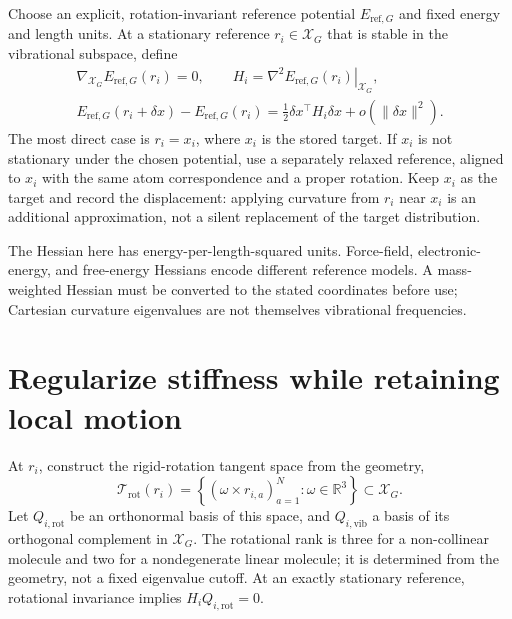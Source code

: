 \documentclass[11pt,letterpaper]{article}
\newcommand{\R}{\mathbb R}
\newcommand{\X}{\mathcal X_G}
\newcommand{\rot}{\mathrm{rot}}
\newcommand{\vib}{\mathrm{vib}}
\begin{document}
Choose an explicit, rotation-invariant reference potential $E_{\mathrm{ref},G}$ and fixed energy and length units. At a stationary reference $r_i\in\X$ that is stable in the vibrational subspace, define
\begin{equation}\label{eq:hessian}
\begin{gathered}
\nabla_{\X} E_{\mathrm{ref},G}(r_i)=0,\qquad
H_i=\left.\nabla^2 E_{\mathrm{ref},G}(r_i)\right|_{\X},\\
E_{\mathrm{ref},G}(r_i+\delta x)-E_{\mathrm{ref},G}(r_i)
=\tfrac12\delta x^\top H_i\delta x+o(\|\delta x\|^2).
\end{gathered}
\end{equation}
The most direct case is $r_i=x_i$, where $x_i$ is the stored target. If $x_i$ is not stationary under the chosen potential, use a separately relaxed reference, aligned to $x_i$ with the same atom correspondence and a proper rotation. Keep $x_i$ as the target and record the displacement: applying curvature from $r_i$ near $x_i$ is an additional approximation, not a silent replacement of the target distribution.

The Hessian here has energy-per-length-squared units. Force-field, electronic-energy, and free-energy Hessians encode different reference models. A mass-weighted Hessian must be converted to the stated coordinates before use; Cartesian curvature eigenvalues are not themselves vibrational frequencies.

\section{Regularize stiffness while retaining local motion}

At $r_i$, construct the rigid-rotation tangent space from the geometry,
\begin{equation}\label{eq:rotspace}
\mathcal T_{\rot}(r_i)=
\left\{(\omega\times r_{i,a})_{a=1}^{N}:\omega\in\R^3\right\}\subset\X.
\end{equation}
Let $Q_{i,\rot}$ be an orthonormal basis of this space, and $Q_{i,\vib}$ a basis of its orthogonal complement in $\X$. The rotational rank is three for a non-collinear molecule and two for a nondegenerate linear molecule; it is determined from the geometry, not a fixed eigenvalue cutoff. At an exactly stationary reference, rotational invariance implies $H_iQ_{i,\rot}=0$.
\end{document}
